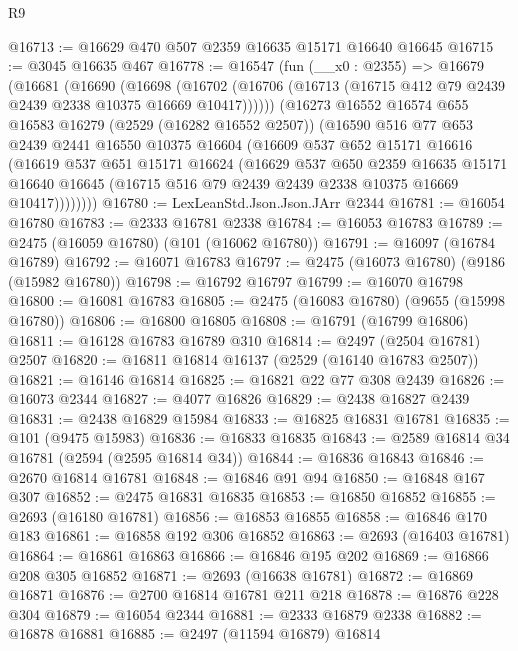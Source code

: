 \begin{lexlean}{R9}
\begin{coremodule}
@16713 := @16629 @470 @507 @2359 @16635 @15171 @16640 @16645
@16715 := @3045 @16635 @467
@16778 := @16547
    (fun (__x0 : @2355) =>
    @16679
      (@16681
        (@16690
          (@16698
            (@16702 (@16706 (@16713 (@16715 @412 @79 @2439 @2439 @2338 @10375 @16669 @10417))))))
        (@16273
          @16552
          @16574
          @655
          @16583
          @16279
          (@2529 (@16282 @16552 @2507))
          (@16590
            @516
            @77
            @653
            @2439
            @2441
            @16550
            @10375
            @16604
            (@16609
              @537
              @652
              @15171
              @16616
              (@16619
                @537
                @651
                @15171
                @16624
                (@16629
                  @537
                  @650
                  @2359
                  @16635
                  @15171
                  @16640
                  @16645
                  (@16715 @516 @79 @2439 @2439 @2338 @10375 @16669 @10417))))))))
@16780 := LexLeanStd.Json.Json.JArr @2344
@16781 := @16054 @16780
@16783 := @2333 @16781 @2338
@16784 := @16053 @16783
@16789 := @2475 (@16059 @16780) (@101 (@16062 @16780))
@16791 := @16097 (@16784 @16789)
@16792 := @16071 @16783
@16797 := @2475 (@16073 @16780) (@9186 (@15982 @16780))
@16798 := @16792 @16797
@16799 := @16070 @16798
@16800 := @16081 @16783
@16805 := @2475 (@16083 @16780) (@9655 (@15998 @16780))
@16806 := @16800 @16805
@16808 := @16791 (@16799 @16806)
@16811 := @16128 @16783 @16789 @310
@16814 := @2497 (@2504 @16781) @2507
@16820 := @16811 @16814 @16137 (@2529 (@16140 @16783 @2507))
@16821 := @16146 @16814
@16825 := @16821 @22 @77 @308 @2439
@16826 := @16073 @2344
@16827 := @4077 @16826
@16829 := @2438 @16827 @2439
@16831 := @2438 @16829 @15984
@16833 := @16825 @16831 @16781
@16835 := @101 (@9475 @15983)
@16836 := @16833 @16835
@16843 := @2589 @16814 @34 @16781 (@2594 (@2595 @16814 @34))
@16844 := @16836 @16843
@16846 := @2670 @16814 @16781
@16848 := @16846 @91 @94
@16850 := @16848 @167 @307
@16852 := @2475 @16831 @16835
@16853 := @16850 @16852
@16855 := @2693 (@16180 @16781)
@16856 := @16853 @16855
@16858 := @16846 @170 @183
@16861 := @16858 @192 @306 @16852
@16863 := @2693 (@16403 @16781)
@16864 := @16861 @16863
@16866 := @16846 @195 @202
@16869 := @16866 @208 @305 @16852
@16871 := @2693 (@16638 @16781)
@16872 := @16869 @16871
@16876 := @2700 @16814 @16781 @211 @218
@16878 := @16876 @228 @304
@16879 := @16054 @2344
@16881 := @2333 @16879 @2338
@16882 := @16878 @16881
@16885 := @2497 (@11594 @16879) @16814

\end{coremodule}
\end{lexlean}
